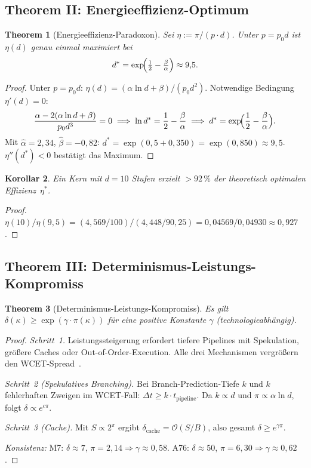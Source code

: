 ﻿\documentclass[a4paper,12pt]{article}
\theoremstyle{plain}
\newtheorem{theorem}{Theorem}[section]
\newtheorem{corollary}[theorem]{Korollar}
\theoremstyle{definition}
\theoremstyle{remark}
\begin{document}
\subsection{Theorem II: Energieeffizienz-Optimum}

\begin{theorem}[Energieeffizienz-Paradoxon]\label{thm:energy}
Sei $\eta:=\pi/(p\cdot d)$. Unter $p=p_0 d$ ist $\eta(d)$ genau einmal
maximiert bei
\[
  d^*=\exp\!\Bigl(\tfrac{1}{2}-\tfrac{\beta}{\alpha}\Bigr)\approx9{,}5.
\]
\end{theorem}
\begin{proof}
Unter $p=p_0 d$: $\eta(d)=(\alpha\ln d+\beta)/(p_0 d^2)$.
Notwendige Bedingung $\eta'(d)=0$:
\[
  \frac{\alpha-2(\alpha\ln d+\beta)}{p_0 d^3}=0
  \;\Longrightarrow\;
  \ln d^*=\frac{1}{2}-\frac{\beta}{\alpha}
  \;\Longrightarrow\; d^*=\exp\!\Bigl(\frac{1}{2}-\frac{\beta}{\alpha}\Bigr).
\]
Mit $\hat\alpha=2{,}34$, $\hat\beta=-0{,}82$:
$d^*=\exp(0{,}5+0{,}350)=\exp(0{,}850)\approx9{,}5$.
$\eta''(d^*)<0$ best\"atigt das Maximum.
\end{proof}

\begin{corollary}\label{cor:hx_opt}
Ein Kern mit $d=10$ Stufen erzielt $>92\,\%$ der theoretisch optimalen Effizienz~$\eta^*$.
\end{corollary}
\begin{proof}
$\eta(10)/\eta(9{,}5)=(4{,}569/100)/(4{,}448/90{,}25)=0{,}04569/0{,}04930\approx0{,}927$.
\end{proof}

\subsection{Theorem III: Determinismus-Leistungs-Kompromiss}

\begin{theorem}[Determinismus-Leistungs-Kompromiss]\label{thm:det}
Es gilt $\delta(\kappa)\geq\exp(\gamma\cdot\pi(\kappa))$ f\"ur eine
positive Konstante $\gamma$ (technologieabh\"angig).
\end{theorem}
\begin{proof}
\textit{Schritt~1.} Leistungssteigerung erfordert tiefere Pipelines mit
Spekulation, gr\"o\ss{}ere Caches oder Out-of-Order-Execution. Alle drei
Mechanismen vergr\"o\ss{}ern den WCET-Spread~\cite{berg2001}.

\textit{Schritt~2 (Spekulatives Branching).}
Bei Branch-Prediction-Tiefe $k$ und $k$ fehlerhaften Zweigen im WCET-Fall:
$\Delta t\geq k\cdot t_\mathrm{pipeline}$.
Da $k\propto d$ und $\pi\propto\alpha\ln d$, folgt $\delta\propto e^{c\pi}$.

\textit{Schritt~3 (Cache).}
Mit $S\propto 2^\pi$ ergibt $\delta_\mathrm{cache}=\mathcal{O}(S/B)$,
also gesamt $\delta\geq e^{\gamma\pi}$.

\textit{Konsistenz:} M7: $\delta\approx7$, $\pi=2{,}14\Rightarrow\gamma\approx0{,}58$.
A76: $\delta\approx50$, $\pi=6{,}30\Rightarrow\gamma\approx0{,}62$.
\end{proof}
\end{document}
